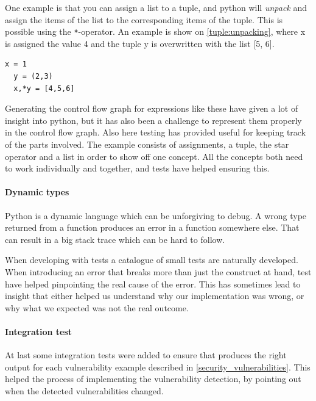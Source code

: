 One example is that you can assign a list to a tuple, and python will \emph{unpack} and assign the items of the list to the corresponding items of the tuple.
This is possible using the \texttt{*}-operator.
An example is show on \cref{tuple:unpacking}, where x is assigned the value 4 and the tuple y is overwritten with the list [5, 6].
\begin{lstlisting}[style=python, caption={Tuple unpacking}, label=tuple:unpacking]
  x = 1
  y = (2,3)
  x,*y = [4,5,6]
\end{lstlisting}

Generating the control flow graph for expressions like these have given a lot of insight into python, but it has also been a challenge to represent them properly in the control flow graph.
Also here testing has provided useful for keeping track of the parts involved.
The example consists of assignments, a tuple, the star operator and a list in order to show off one concept.
All the concepts both need to work individually and together, and tests have helped ensuring this.

\paragraph{Dynamic types}
Python is a dynamic language which can be unforgiving to debug.
A wrong type returned from a function produces an error in a function somewhere else.
That can result in a big stack trace which can be hard to follow.

When developing with tests a catalogue of small tests are naturally developed.
When introducing an error that breaks more than just the construct at hand, test have helped pinpointing the real cause of the error.
This has sometimes lead to insight that either helped us understand why our implementation was wrong, or why what we expected was not the real outcome.

\paragraph{Integration test}
At last some integration tests were added to ensure that \pyt{} produces the right output for each vulnerability example described in \cref{security_vulnerabilities}.
This helped the process of implementing the vulnerability detection, by pointing out when the detected vulnerabilities changed.
